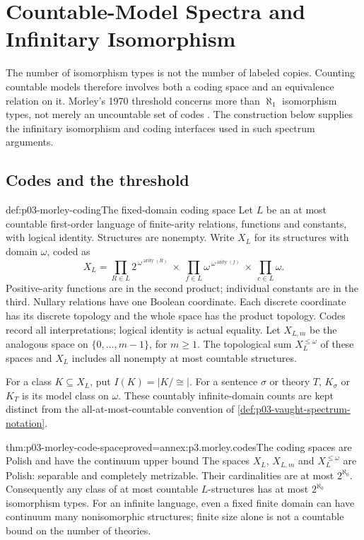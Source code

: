\section{Countable-Model Spectra and Infinitary Isomorphism}
\label{sec:p03-n-a-004-02}

The number of isomorphism types is not the number of labeled copies.
Counting countable models therefore involves both a coding space
and an equivalence relation on it. Morley's 1970 threshold concerns
more than \(\aleph_1\) isomorphism types, not merely an uncountable
set of codes \cite{Morley1970CountableModels}.
The construction below supplies the infinitary isomorphism and
coding interfaces used in such spectrum arguments.

\subsection{Codes and the threshold}
\label{sec:p03-morley-codes}

\begin{hbdefinition}{def:p03-morley-coding}{The fixed-domain coding space}
Let \(L\) be an at most countable first-order language of
finite-arity relations, functions and constants, with logical
identity. Structures are nonempty. Write \(X_L\) for its
structures with domain \(\omega\), coded as
\[
 X_L=
 \prod_{R\in L}2^{\,\omega^{\operatorname{arity}(R)}}
 \ \times\
 \prod_{f\in L}\omega^{\,\omega^{\operatorname{arity}(f)}}
 \ \times\
 \prod_{c\in L}\omega .
\]
Positive-arity functions are in the second product;
individual constants are in the third. Nullary relations have
one Boolean coordinate. Each discrete coordinate has its
discrete topology and the whole space has the product topology.
Codes record all interpretations; logical identity is actual equality.
Let \(X_{L,m}\) be the analogous space on
\(\{0,\ldots,m-1\}\), for \(m\geq1\).
The topological sum \(X_L^{\leq\omega}\) of these spaces and
\(X_L\) includes all nonempty at most countable structures.

For a class \(K\subseteq X_L\), put
\(I(K)=|K/{\cong}|\). For a sentence \(\sigma\) or theory \(T\),
\(K_\sigma\) or \(K_T\) is its model class on \(\omega\).
These countably infinite-domain counts are kept distinct
from the all-at-most-countable convention of
\cref{def:p03-vaught-spectrum-notation}.
\end{hbdefinition}

\begin{hblemma}{thm:p03-morley-code-space}{proved=annex:p3.morley.codes}{The coding spaces are Polish and have the continuum upper bound}
The spaces \(X_L\), \(X_{L,m}\) and \(X_L^{\leq\omega}\)
are Polish: separable and completely metrizable.
Their cardinalities are at most \(2^{\aleph_0}\).
Consequently any class of at most countable \(L\)-structures
has at most \(2^{\aleph_0}\) isomorphism types.
For an infinite language, even a fixed finite domain can
have continuum many nonisomorphic structures; finite size
alone is not a countable bound on the number of theories.
\end{hblemma}

